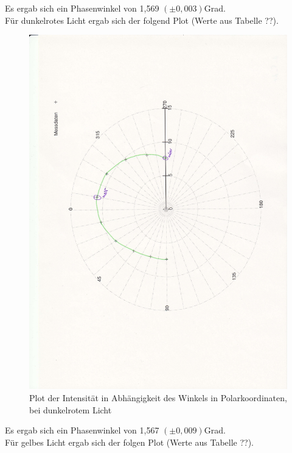 \documentclass[12pt]{scrartcl}
\begin{document}
\begin{enumerate}
Es ergab sich ein Phasenwinkel von 1,569 $(\pm 0,003)$Grad.\\

Für dunkelrotes Licht ergab sich der folgend Plot (Werte aus Tabelle ??).

\begin{figure}[H]
\centering
    \includegraphics[scale = 0.3, angle = -90]{a_5_dr.pdf}
  	\caption[Plot der Intensität in Abhängigkeit des Winkels in Polarkoordinaten, bei dunkelrotem Licht]{Plot der Intensität in Abhängigkeit des Winkels in Polarkoordinaten, bei dunkelrotem Licht}
  \label{fig:a_5_dr}
\end{figure}

Es ergab sich ein Phasenwinkel von 1,567 $(\pm 0,009)$Grad.\\

Für gelbes Licht ergab sich der folgen Plot (Werte aus Tabelle ??).


\end{enumerate}
\end{document}
